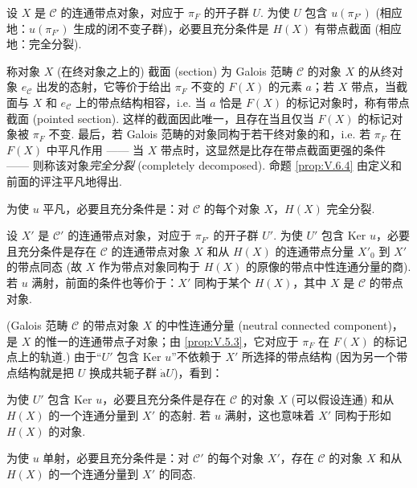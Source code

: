 \begin{proposition}\label{prop:V.6.4}
设 $X$ 是 $\mathcal{C}$ 的连通带点对象，对应于 $\pi_F$ 的开子群 $U$. 为使 $U$ 包含 $u(\pi_{F'})$ (相应地：$u(\pi_{F'})$ 生成的闭不变子群)，必要且充分条件是 $H(X)$ 有带点截面 (相应地：完全分裂).
\end{proposition}

称对象 $X$ (在终对象之上的) 截面 (section) 为 Galois 范畴 $\mathcal{C}$ 的对象 $X$ 的从终对象 $e_{\mathcal{C}}$ 出发的态射，它等价于给出 $\pi_F$ 不变的 $F(X)$ 的元素 $a$；若 $X$ 带点，当截面与 $X$ 和 $e_{\mathcal{C}}$ 上的带点结构相容，i.e. 当 $a$ 恰是 $F(X)$ 的标记对象时，称有带点截面 (pointed section). 这样的截面因此唯一，且存在当且仅当 $F(X)$ 的标记对象被 $\pi_F$ 不变. 最后，若 Galois 范畴的对象同构于若干终对象的和，i.e. 若 $\pi_F$ 在 $F(X)$ 中平凡作用 —— 当 $X$ 带点时，这显然是比存在带点截面更强的条件 —— 则称该对象\emph{完全分裂} (completely decomposed). 命题 \ref{prop:V.6.4} 由定义和前面的评注平凡地得出.

\begin{corollary}\label{cor:V.6.5}
为使 $u$ 平凡，必要且充分条件是：对 $\mathcal{C}$ 的每个对象 $X$，$H(X)$ 完全分裂.
\end{corollary}

\begin{proposition}\label{prop:V.6.6}
设 $X'$ 是 $\mathcal{C}'$ 的连通带点对象，对应于 $\pi_{F'}$ 的开子群 $U'$. 为使 $U'$ 包含 Ker $u$，必要且充分条件是存在 $\mathcal{C}$ 的连通带点对象 $X$ 和从 $H(X)$ 的连通带点分量 $X'_0$ 到 $X'$ 的带点同态 (故 $X$ 作为带点对象同构于 $H(X)$ 的原像的带点中性连通分量的商). 若 $u$ 满射，前面的条件也等价于：$X'$ 同构于某个 $H(X)$，其中 $X$ 是 $\mathcal{C}$ 的带点对象.
\end{proposition}

(Galois 范畴 $\mathcal{C}$ 的带点对象 $X$ 的中性连通分量 (neutral connected component)，是 $X$ 的惟一的连通带点子对象；由 \ref{prop:V.5.3}，它对应于 $\pi_F$ 在 $F(X)$ 的标记点上的轨道.) 由于``$U'$ 包含 Ker $u$''不依赖于 $X'$ 所选择的带点结构 (因为另一个带点结构就是把 $U$ 换成共轭子群 $\dot{\mathrm{a}} U$)，看到：

\begin{corollary}\label{cor:V.6.7}
为使 $U'$ 包含 Ker $u$，必要且充分条件是存在 $\mathcal{C}$ 的对象 $X$ (可以假设连通) 和从 $H(X)$ 的一个连通分量到 $X'$ 的态射. 若 $u$ 满射，这也意味着 $X'$ 同构于形如 $H(X)$ 的对象.
\end{corollary}

\begin{corollary}\label{cor:V.6.8}
为使 $u$ 单射，必要且充分条件是：对 $\mathcal{C}'$ 的每个对象 $X'$，存在 $\mathcal{C}$ 的对象 $X$ 和从 $H(X)$ 的一个连通分量到 $X'$ 的同态.
\end{corollary}

